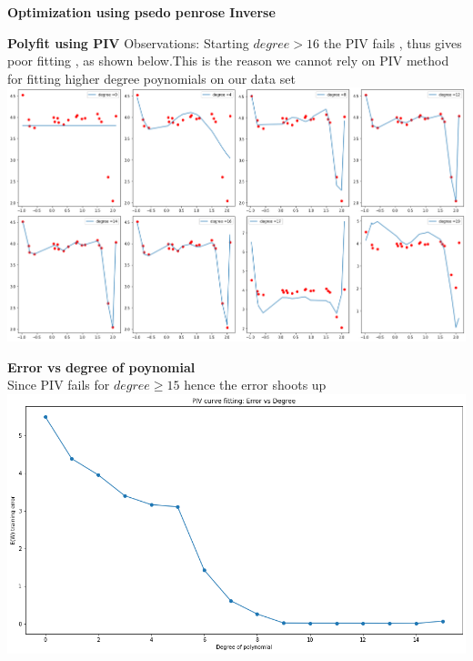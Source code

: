 \documentclass[11pt]{beamer}
\begin{document}
\begin{frame}
\textbf{\large{Optimization using psedo penrose Inverse}}
\end{frame}


\begin{frame}
\textbf{Polyfit using PIV}
Observations: Starting  $degree > 16$  the PIV fails , thus gives poor fitting , as shown below.This is the reason we cannot rely on PIV method for fitting higher degree poynomials on our data set
\includegraphics[scale=0.25]{images/6..png}
\end{frame}

\begin{frame}
\textbf{Error vs degree of poynomial }\\
Since PIV fails for $degree \geq 15$ hence the error shoots up
\includegraphics[scale=0.3]{images/7.png}
\end{frame}
\end{document}
